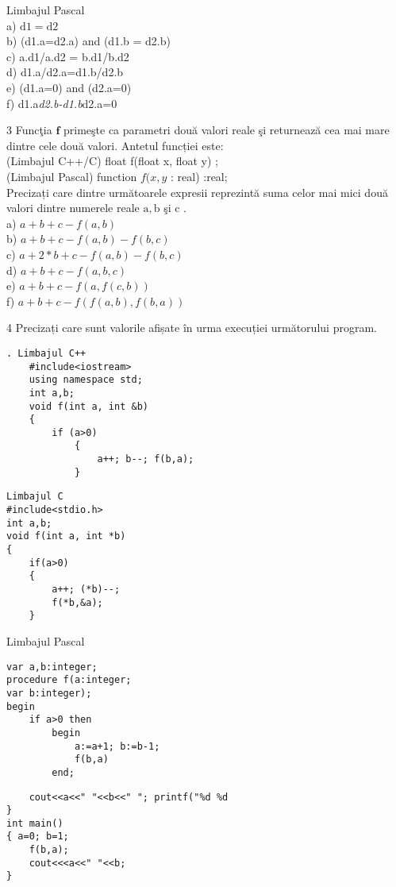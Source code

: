 Limbajul Pascal\\
a) $\mathrm{d} 1=\mathrm{d} 2$\\
b) (d1.a=d2.a) and (d1.b = d2.b)\\
c) a.d1/a.d2 = b.d1/b.d2\\
d) d1.a/d2.a=d1.b/d2.b\\
e) (d1.a=0) and (d2.a=0)\\
f) d1.a\textit{d2.b-d1.b}d2.a=0

3 Funcţia $\mathbf{f}$ primeşte ca parametri două valori reale şi returnează cea mai mare dintre cele două valori. Antetul funcției este:\\
(Limbajul C++/C) float f(float x, float y) ;\\
(Limbajul Pascal) function $f(x, y$ : real) :real;\\
Precizați care dintre următoarele expresii reprezintă suma celor mai mici două valori dintre numerele reale $\mathrm{a}, \mathrm{b}$ şi c .\\
a) $a+b+c-f(a, b)$\\
b) $a+b+c-f(a, b)-f(b, c)$\\
c) $a+2 * b+c-f(a, b)-f(b, c)$\\
d) $a+b+c-f(a, b, c)$\\
e) $a+b+c-f(a, f(c, b))$\\
f) $a+b+c-f(f(a, b), f(b, a))$

4 Precizați care sunt valorile afișate în urma execuției următorului program.

\begin{verbatim}
. Limbajul C++
    #include<iostream>
    using namespace std;
    int a,b;
    void f(int a, int &b)
    {
        if (a>0)
            {
                a++; b--; f(b,a);
            }
\end{verbatim}

\begin{verbatim}
Limbajul C
#include<stdio.h>
int a,b;
void f(int a, int *b)
{
    if(a>0)
    {
        a++; (*b)--;
        f(*b,&a);
    }
\end{verbatim}

Limbajul Pascal

\begin{verbatim}
var a,b:integer;
procedure f(a:integer;
var b:integer);
begin
    if a>0 then
        begin
            a:=a+1; b:=b-1;
            f(b,a)
        end;
\end{verbatim}

\begin{verbatim}
    cout<<a<<" "<<b<<" "; printf("%d %d
}
int main()
{ a=0; b=1;
    f(b,a);
    cout<<<a<<" "<<b;
}
\end{verbatim}


